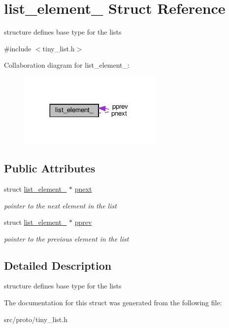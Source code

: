 \hypertarget{structlist__element__}{}\section{list\+\_\+element\+\_\+ Struct Reference}
\label{structlist__element__}


structure defines base type for the lists  




{\ttfamily \#include $<$tiny\+\_\+list.\+h$>$}



Collaboration diagram for list\+\_\+element\+\_\+\+:
\nopagebreak
\begin{figure}[H]
\begin{center}
\leavevmode
\includegraphics[width=200pt]{structlist__element____coll__graph}
\end{center}
\end{figure}
\subsection*{Public Attributes}
\begin{DoxyCompactItemize}
\item 
\mbox{\label{structlist__element___a81cb2c54606be8120460bded0d919039}} 
struct \hyperlink{structlist__element__}{list\+\_\+element\+\_\+} $\ast$ \hyperlink{structlist__element___a81cb2c54606be8120460bded0d919039}{pnext}
\begin{DoxyCompactList}\small\item\em pointer to the next element in the list \end{DoxyCompactList}\item 
\mbox{\label{structlist__element___a0f6c573966c9d70d4a2ef19b73717515}} 
struct \hyperlink{structlist__element__}{list\+\_\+element\+\_\+} $\ast$ \hyperlink{structlist__element___a0f6c573966c9d70d4a2ef19b73717515}{pprev}
\begin{DoxyCompactList}\small\item\em pointer to the previous element in the list \end{DoxyCompactList}\end{DoxyCompactItemize}


\subsection{Detailed Description}
structure defines base type for the lists 

The documentation for this struct was generated from the following file\+:\begin{DoxyCompactItemize}
\item 
src/proto/tiny\+\_\+list.\+h\end{DoxyCompactItemize}

